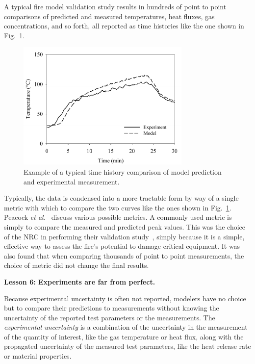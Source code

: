 \documentclass[fleqn,b5paper]{article}
\begin{document}
A typical fire model validation study results in hundreds of point to point comparisons of predicted and measured temperatures, heat fluxes, gas concentrations, and so forth, all reported as time histories like the one shown in Fig.~\ref{temp_history}.
\begin{figure}[ht]
\begin{center}
\includegraphics[height=2.5in]{../FDS_Validation_Guide/FIGURES/sample_time_history}
\end{center}
\caption[Sample time history plots.]{Example of a typical time history comparison of model prediction and experimental measurement.}
\label{temp_history}
\end{figure}
Typically, the data is condensed into a more tractable form by way of a single metric with which to compare the two curves like the ones shown in Fig.~\ref{temp_history}. Peacock {\em et al.}~\cite{Peacock:FSJ1999} discuss various possible metrics. A commonly used metric is simply to compare the measured and predicted peak values. This was the choice of the NRC in performing their validation study~\cite{NUREG_1824}, simply because it is a simple, effective way to assess the fire's potential to damage critical equipment. It was also found that when comparing thousands of point to point measurements, the choice of metric did not change the final results.


\vspace{\parskip}
{\bf Lesson 6: Experiments are far from perfect.}

Because experimental uncertainty is often not reported, modelers have no choice but to compare their predictions to measurements without knowing the uncertainty of the reported test parameters or the measurements. The {\em experimental uncertainty} is a combination of the uncertainty in the measurement of the quantity of interest, like the gas temperature or heat flux, along with the propagated uncertainty of the measured test parameters, like the heat release rate or material properties.
\end{document}
